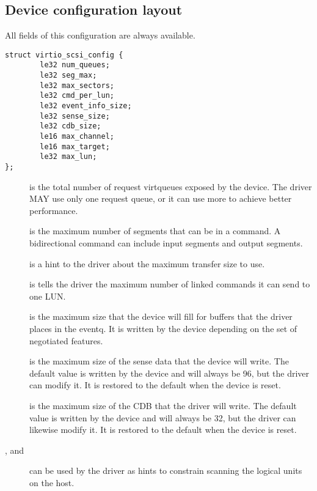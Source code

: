 \subsection{Device configuration layout}\label{sec:Device Types / SCSI Host Device / Device configuration layout}

  All fields of this configuration are always available.

\begin{lstlisting}
struct virtio_scsi_config {
        le32 num_queues;
        le32 seg_max;
        le32 max_sectors;
        le32 cmd_per_lun;
        le32 event_info_size;
        le32 sense_size;
        le32 cdb_size;
        le16 max_channel;
        le16 max_target;
        le32 max_lun;
};
\end{lstlisting}

\begin{description}
\item[] is the total number of request virtqueues exposed by
    the device. The driver MAY use only one request queue,
    or it can use more to achieve better performance.

\item[] is the maximum number of segments that can be in a
    command. A bidirectional command can include  input
    segments and  output segments.

\item[] is a hint to the driver about the maximum transfer
    size to use.

\item[] is tells the driver the maximum number of
    linked commands it can send to one LUN.

\item[] is the maximum size that the device will fill
    for buffers that the driver places in the eventq. It is
    written by the device depending on the set of negotiated
    features.

\item[] is the maximum size of the sense data that the
    device will write. The default value is written by the device
    and will always be 96, but the driver can modify it. It is
    restored to the default when the device is reset.

\item[] is the maximum size of the CDB that the driver will
    write. The default value is written by the device and will
    always be 32, but the driver can likewise modify it. It is
    restored to the default when the device is reset.

\item[,  and ] can be used by the driver
    as hints to constrain scanning the logical units on the
    host.
\end{description}

